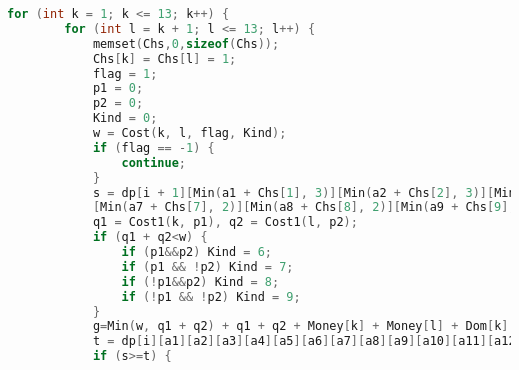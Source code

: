 \begin{lstlisting}[language=C++, numberstyle={\color{black!33}\tiny\sffamily}, basicstyle=\tiny]
	for (int k = 1; k <= 13; k++) {
		for (int l = k + 1; l <= 13; l++) {
			memset(Chs,0,sizeof(Chs));
			Chs[k] = Chs[l] = 1;
			flag = 1;
			p1 = 0;
			p2 = 0;
			Kind = 0;
			w = Cost(k, l, flag, Kind);
			if (flag == -1) {
				continue;
			}
			s = dp[i + 1][Min(a1 + Chs[1], 3)][Min(a2 + Chs[2], 3)][Min(a3 + Chs[3], 2)][Min(a4 + Chs[4], 2)][Min(a5 + Chs[5], 2)][Min(a6 + Chs[6], 2)]
			[Min(a7 + Chs[7], 2)][Min(a8 + Chs[8], 2)][Min(a9 + Chs[9], 2)][Min(a10 + Chs[10], 2)][Min(a11 + Chs[11], 2)][Min(a12 + Chs[12], 2)][Min(a13 + Chs[13], 2)];
			q1 = Cost1(k, p1), q2 = Cost1(l, p2);
			if (q1 + q2<w) {
				if (p1&&p2) Kind = 6;
				if (p1 && !p2) Kind = 7;
				if (!p1&&p2) Kind = 8;
				if (!p1 && !p2) Kind = 9;
			}
			g=Min(w, q1 + q2) + q1 + q2 + Money[k] + Money[l] + Dom[k] * (Nodes[k].End - Nodes[k].Beg) + Dom[l] * (Nodes[l].End - Nodes[l].Beg);
			t = dp[i][a1][a2][a3][a4][a5][a6][a7][a8][a9][a10][a11][a12][a13] + g;
			if (s>=t) {


\end{lstlisting}

